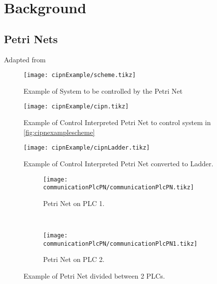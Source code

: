
\chapter{Background}

\section{Petri Nets}
\label{sec:petriNets}


Adapted from \cite{david1989grafcet}
\begin{figure}[H]
  \centering
  \texttt{[image: cipnExample/scheme.tikz]}
  \caption[cipnexample]{Example of System to be controlled by the Petri Net}
  \label{fig:cipnexamplescheme}
\end{figure}

\pagebreak
\begin{figure}[H]
  \centering
  \texttt{[image: cipnExample/cipn.tikz]}
  \caption[cipnexample]{Example of Control Interpreted Petri Net to control
    system in \autoref{fig:cipnexamplescheme}}
  \label{fig:cipnexample}
\end{figure}



\usetikzlibrary{arrows,shapes,circuits.plc.ladder,external}

\begin{figure}[H]
  \centering
  \texttt{[image: cipnExample/cipnLadder.tikz]}
  \caption[cipnexample]{Example of Control Interpreted Petri Net converted to Ladder.}
  \label{fig:cipnexampleLadder}
\end{figure}

\begin{figure}[H]
    \centering
    \begin{subfigure}[t]{0.5\textwidth}
        \centering
        \texttt{[image: communicationPlcPN/communicationPlcPN.tikz]}
        \caption{Petri Net on PLC 1.}
        \label{fig:communicationPlcPN}
    \end{subfigure}%
    ~ 
    \begin{subfigure}[t]{0.5\textwidth}
        \centering
  \texttt{[image: communicationPlcPN/communicationPlcPN1.tikz]}
  \caption{Petri Net on PLC 2.}
  \label{fig:communicationPlcPN1}
    \end{subfigure}
    \caption{Example of Petri Net divided between 2 PLCs.}
\end{figure}


